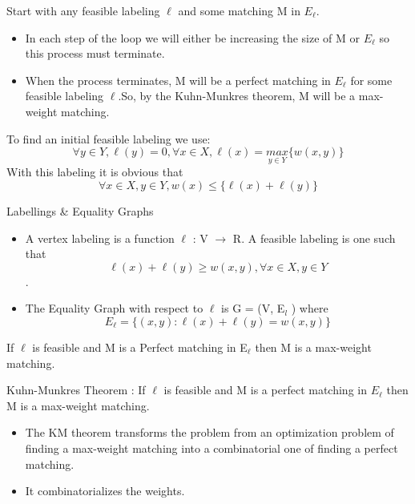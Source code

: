 \begin{algorithm}[H]%
\begin{scriptsize}
Start with any feasible labeling $\ell$ and some matching M in $E_\ell$.\\
\begin{itemize}
\item In each step of the loop we will either be increasing the size of M or $E_\ell$ so this process must terminate. 
\item When the process terminates, M will be a perfect matching in $E_\ell$ for some feasible labeling $\ell$.So, by the Kuhn-Munkres theorem, M will be a max-weight matching.
\end{itemize}
To find an initial feasible labeling we use:
$$ \forall y \in Y, \ell(y) = 0,\forall x \in X, \ell(x) = \underset{y \in Y}{max} \{w(x, y)\}$$
With this labeling it is obvious that
$$ \forall x \in X, y \in Y, w(x) \leq \{\ell(x) + \ell(y)\}$$
\end{scriptsize}
\end{algorithm}


\begin{frame}{Labellings \& Equality Graphs}
\begin{itemize}


\item A vertex labeling is a function $\ell$ : V $\rightarrow$ R. \newline
A feasible labeling is one such that $$\ell(x) + \ell(y) \geq w(x, y),\forall x \in X, y \in Y$$.
\item The Equality Graph with respect to $\ell$ is G = (V, E$_l$ ) where
$$E_\ell = \{(x, y) : \ell(x) + \ell(y) = w(x, y ) \}$$
\end{itemize}
\end{frame}


\begin{frame}

\begin{theorem}\label{my theorem}
If $\ell$ is feasible and M is a Perfect matching
in E$_\ell$ then M is a max-weight matching.%
\end{theorem}


\begin{theorem}{Kuhn-Munkres Theorem} : If $\ell$ is feasible and M is a
perfect matching in $E_\ell$ then M is a max-weight matching.
\end{theorem}
\begin{itemize}
\item The KM theorem transforms the problem from an optimization problem of finding a max-weight matching into a combinatorial one of finding a perfect matching.
\item  It combinatorializes the weights.
\end{itemize}
\end{frame}
